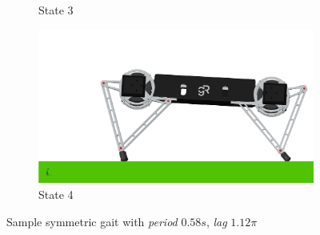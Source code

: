 \documentclass[conference,11pt,letterpaper]{IEEEtran}
\begin{document}
\begin{figure}[t!]
\begin{subfigure}[t]{0.45\linewidth}
        \caption{State 3}
    \end{subfigure}%
    \begin{subfigure}[t]{0.45\linewidth}
        \includegraphics[width=\textwidth]{symm_snap4}
        \caption{State 4}
    \end{subfigure}%
    \caption{Sample symmetric gait with \emph{period} $0.58 s$, \emph{lag} $1.12\pi$}
    \label{fig:sym_gait}
\end{figure}
\end{document}
